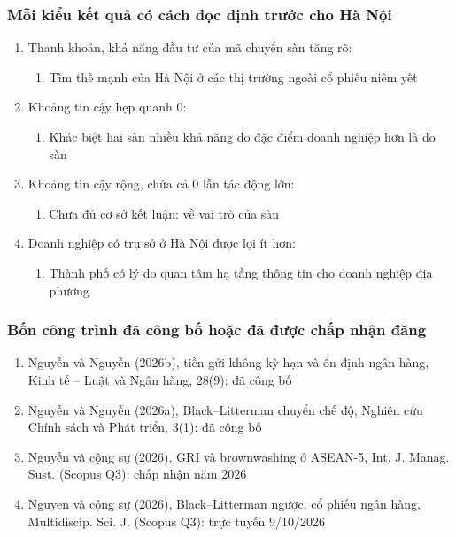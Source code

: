 \documentclass[11pt, xcolor={dvipsnames}, aspectratio=169, usepdftitle=false]{beamer}
\begin{document}
\begin{frame}
\frametitle{Mỗi kiểu kết quả có cách đọc định trước cho Hà Nội}
\begin{enumerate}
\item Thanh khoản, khả năng đầu tư của mã chuyển sàn tăng rõ:
\begin{enumerate}
\item Tìm thế mạnh của Hà Nội ở các thị trường ngoài cổ phiếu niêm yết
\end{enumerate}
\item Khoảng tin cậy hẹp quanh 0:
\begin{enumerate}
\item Khác biệt hai sàn nhiều khả năng do đặc điểm doanh nghiệp hơn là do sàn
\end{enumerate}
\item Khoảng tin cậy rộng, chứa cả 0 lẫn tác động lớn:
\begin{enumerate}
\item Chưa đủ cơ sở kết luận:  về vai trò của sàn
\end{enumerate}
\item Doanh nghiệp có trụ sở ở Hà Nội được lợi ít hơn:
\begin{enumerate}
\item Thành phố có lý do quan tâm hạ tầng thông tin cho doanh nghiệp địa phương
\end{enumerate}
\end{enumerate}
\end{frame}


\begin{frame}[label=congTrinh]
\frametitle{Bốn công trình đã công bố hoặc đã được chấp nhận đăng}
\begin{enumerate}
\item Nguyễn và Nguyễn (2026b), tiền gửi không kỳ hạn và ổn định ngân hàng, Kinh tế -- Luật và Ngân hàng, 28(9): đã công bố
\item Nguyễn và Nguyễn (2026a), Black--Litterman chuyển chế độ, Nghiên cứu Chính sách và Phát triển, 3(1): đã công bố
\item Nguyễn và cộng sự (2026), GRI và brownwashing ở ASEAN-5, Int. J. Manag. Sust. (Scopus Q3): chấp nhận năm 2026
\item Nguyen và cộng sự (2026), Black--Litterman ngược, cổ phiếu ngân hàng, Multidiscip. Sci. J. (Scopus Q3): trực tuyến 9/10/2026
\end{enumerate}
\hyperlink{banThao}{}
\hyperlink{dungCho}{}
\end{frame}
\end{document}
